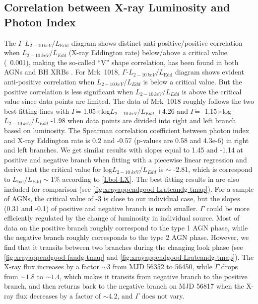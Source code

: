 \documentclass[twocolumn]{aastex63}
\begin{document}
\subsection{Correlation between X-ray Luminosity and Photon Index}
The $\Gamma$-$L_{2-10\,keV}/L_\mathrm{Edd}$ diagram shows distinct anti-positive/positive correlation when $L_{2-10~ keV}/L_{Edd}$ (X-ray Eddington rate) below/above a critical value (~0.001), making the so-called ``V'' shape correlation, has been found in both AGNs and BH XRBs \citep[e.g.][]{2011A&A...530A.149Y,2015MNRAS.447.1692Y}. For Mrk~1018, $\Gamma$-$L_{2-10\,keV}/L_\mathrm{Edd}$ diagram shows evident anti-positive correlation when $L_{2-10\,keV}/L_{Edd}$ is below a critical value. But the positive correlation is less significant when $L_{2-10\,keV}/L_{Edd}$ is above the critical value since data points are limited. The data of Mrk~1018 roughly follows the two best-fitting lines with $\Gamma$= 1.05$\times$log$L_{2-10~ keV}/L_{Edd}$ +4.26 and $\Gamma$= -1.15$\times$log$L_{2-10~ keV}/L_{Edd}$ -1.98  when data points are divided into right and left branch based on luminosity. The Spearman correlation coefficient between photon index and X-ray Eddington rate is 0.2 and -0.57 (p-values are 0.58 and 4.3e-6) in right and left branches. We get similar results with slopes equal to 1.45 and -1.14 at positive and negative branch when fitting with a piecewise linear regression and derive that the critical value for log$L_{2-10~ keV}/L_{Edd}$ is $\sim$ -2.81, which is correspond to $L_\mathrm{bol}/L_\mathrm{Edd}\sim$1\% according to \autoref{Lbol-LX}. The best-fitting results in \citet{2015MNRAS.447.1692Y} are also included for comparison (see \autoref{fig:xrayappendgood-Lrateandg-tmap}). For a sample of AGNs, the critical value of -3 is close to our individual case, but the slopes (0.31 and -0.1) of positive and negative branch is much smaller. $\Gamma$ could be more efficiently regulated by the change of luminosity in individual source. Most of data on the positive branch roughly correspond to the type 1 AGN phase, while the negative branch roughly corresponds to the type 2 AGN phase. However, we find that it transits between two branches during the changing look phase (see \autoref{fig:xrayappendgood-fandg-tmap} and \autoref{fig:xrayappendgood-Lrateandg-tmap}). The X-ray flux increases by a factor $\sim3$ from MJD 56352 to 56450, while $\Gamma$ drops from $\sim1.8$ to $\sim1.4$, which makes it transits from negative branch to the positive branch, and then returns back to the negative branch on MJD 56817 when the X-ray flux decreases by a factor of $\sim$4.2, and $\Gamma$ does not vary. 
\end{document}
